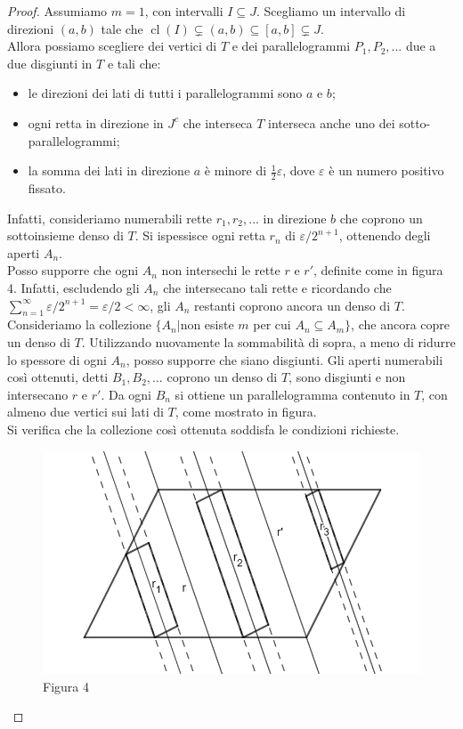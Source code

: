 \documentclass[a4paper, twoside,openright]{article}
\newcommand{\e}{\varepsilon}
\newcommand{\<}{\langle}
\renewcommand{\>}{\rangle}
\begin{document}
\begin{proof}
	Assumiamo $m=1$, con intervalli $I \subseteq J$. Scegliamo un intervallo di direzioni $(a, b)$ tale che $\operatorname{cl}(I) \subsetneq(a, b) \subseteq[a, b] \subsetneq J$.\\
	Allora possiamo scegliere dei vertici di $T$ e dei parallelogrammi $P_1, P_2, ...$ due a due disgiunti in $T$ e tali che:
		\begin{itemize}
		\item le direzioni dei lati di tutti i parallelogrammi sono $a$ e $b$;
		\item ogni retta in direzione in $J^c$ che interseca $T$ interseca anche uno dei sotto-parallelogrammi;
		\item la somma dei lati in direzione $a$ è minore di $\frac{1}{2} \varepsilon$, dove $\varepsilon$ è un numero positivo fissato.
	\end{itemize}	
	Infatti, consideriamo numerabili rette $r_1, r_2, ...$ in direzione $b$ che coprono un sottoinsieme denso di $T$. Si ispessisce ogni retta $r_n$ di $\e/2^{n+1}$, ottenendo degli aperti $A_n$.\\
	Posso supporre che ogni $A_n$ non intersechi le rette $r$ e $r'$, definite come in figura 4. Infatti, escludendo gli $A_n$ che intersecano tali rette e ricordando che $\sum _{n=1}^\infty\e/2^{n+1}= \e/2 <\infty$, gli $A_n$ restanti coprono ancora un denso di $T$.\\
	Consideriamo la collezione $\{A_n | $non esiste $m$ per cui $A_n \subseteq A_m\}$, che ancora copre un denso di $T$. Utilizzando nuovamente la sommabilità di sopra, a meno di ridurre lo spessore di ogni $A_n$, posso supporre che siano disgiunti. Gli aperti numerabili così ottenuti, detti $B_1, B_2, ...$ coprono un denso di $T$, sono disgiunti e non intersecano $r$ e $r'$. Da ogni $B_n$ si ottiene un parallelogramma contenuto in $T$, con almeno due vertici sui lati di $T$, come mostrato in figura.\\
	Si verifica che la collezione così ottenuta soddisfa le condizioni richieste.\\
	
\begin{figure} [h!]
	\includegraphics[width=0.6\columnwidth]{disegno}
	\centering
	\caption{Figura 4}
\end{figure}


\end{proof}
\end{document}

